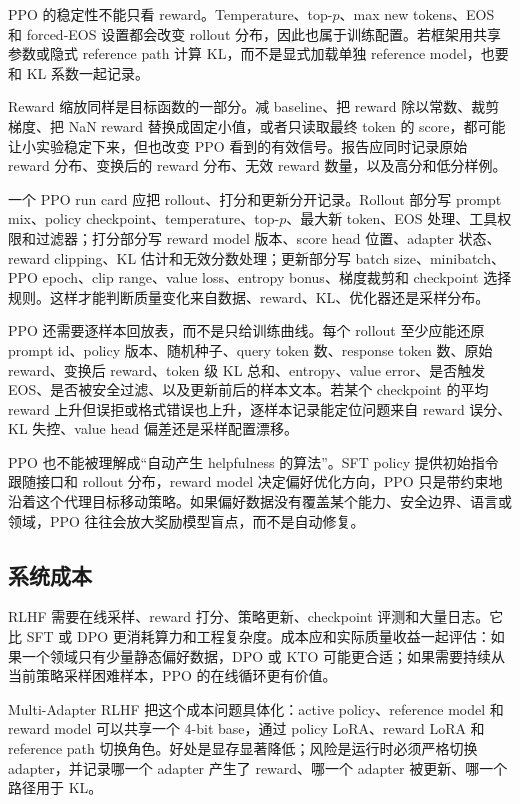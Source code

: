 \documentclass[UTF8,zihao=-4,openany]{ctexbook}
\begin{document}
PPO 的稳定性不能只看 reward。Temperature、top-$p$、max new tokens、EOS 和 forced-EOS 设置都会改变 rollout 分布，因此也属于训练配置。若框架用共享参数或隐式 reference path 计算 KL，而不是显式加载单独 reference model，也要和 KL 系数一起记录。

Reward 缩放同样是目标函数的一部分。减 baseline、把 reward 除以常数、裁剪梯度、把 NaN reward 替换成固定小值，或者只读取最终 token 的 score，都可能让小实验稳定下来，但也改变 PPO 看到的有效信号。报告应同时记录原始 reward 分布、变换后的 reward 分布、无效 reward 数量，以及高分和低分样例。

一个 PPO run card 应把 rollout、打分和更新分开记录。Rollout 部分写 prompt mix、policy checkpoint、temperature、top-$p$、最大新 token、EOS 处理、工具权限和过滤器；打分部分写 reward model 版本、score head 位置、adapter 状态、reward clipping、KL 估计和无效分数处理；更新部分写 batch size、minibatch、PPO epoch、clip range、value loss、entropy bonus、梯度裁剪和 checkpoint 选择规则。这样才能判断质量变化来自数据、reward、KL、优化器还是采样分布。

PPO 还需要逐样本回放表，而不是只给训练曲线。每个 rollout 至少应能还原 prompt id、policy 版本、随机种子、query token 数、response token 数、原始 reward、变换后 reward、token 级 KL 总和、entropy、value error、是否触发 EOS、是否被安全过滤、以及更新前后的样本文本。若某个 checkpoint 的平均 reward 上升但误拒或格式错误也上升，逐样本记录能定位问题来自 reward 误分、KL 失控、value head 偏差还是采样配置漂移。

PPO 也不能被理解成“自动产生 helpfulness 的算法”。SFT policy 提供初始指令跟随接口和 rollout 分布，reward model 决定偏好优化方向，PPO 只是带约束地沿着这个代理目标移动策略。如果偏好数据没有覆盖某个能力、安全边界、语言或领域，PPO 往往会放大奖励模型盲点，而不是自动修复。

\subsection{系统成本}
RLHF 需要在线采样、reward 打分、策略更新、checkpoint 评测和大量日志。它比 SFT 或 DPO 更消耗算力和工程复杂度。成本应和实际质量收益一起评估：如果一个领域只有少量静态偏好数据，DPO 或 KTO 可能更合适；如果需要持续从当前策略采样困难样本，PPO 的在线循环更有价值。

Multi-Adapter RLHF 把这个成本问题具体化：active policy、reference model 和 reward model 可以共享一个 4-bit base，通过 policy LoRA、reward LoRA 和 reference path 切换角色。好处是显存显著降低；风险是运行时必须严格切换 adapter，并记录哪一个 adapter 产生了 reward、哪一个 adapter 被更新、哪一个路径用于 KL。
\end{document}
